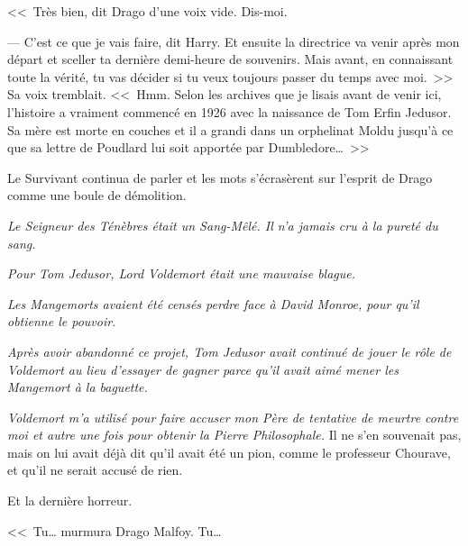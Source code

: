<<~Très bien, dit Drago d'une voix vide. Dis-moi.

--- C'est ce que je vais faire, dit Harry. Et ensuite la directrice va venir après mon départ et sceller ta dernière demi-heure de souvenirs. Mais avant, en connaissant toute la vérité, tu vas décider si tu veux toujours passer du temps avec moi.~>> Sa voix tremblait. <<~Hmm. Selon les archives que je lisais avant de venir ici, l'histoire a vraiment commencé en 1926 avec la naissance de Tom Erfin Jedusor. Sa mère est morte en couches et il a grandi dans un orphelinat Moldu jusqu'à ce que sa lettre de Poudlard lui soit apportée par Dumbledore…~>>

Le Survivant continua de parler et les mots s'écrasèrent sur l'esprit de Drago comme une boule de démolition.

\emph{Le Seigneur des Ténèbres était un Sang-Mêlé. Il n'a jamais cru à la pureté du sang.}

\emph{Pour Tom Jedusor, Lord Voldemort était une mauvaise blague.}

\emph{Les Mangemorts avaient été censés perdre face à David Monroe, pour qu'il obtienne le pouvoir.}

\emph{Après avoir abandonné ce projet, Tom Jedusor avait continué de jouer le rôle de Voldemort au lieu d'essayer de gagner parce qu'il avait aimé mener les Mangemort à la baguette.}

\emph{Voldemort m'a utilisé pour faire accuser mon Père de tentative de meurtre contre moi et autre une fois pour obtenir la Pierre Philosophale.} Il ne s'en souvenait pas, mais on lui avait déjà dit qu'il avait été un pion, comme le professeur Chourave, et qu'il ne serait accusé de rien.

Et la dernière horreur.

<<~Tu… murmura Drago Malfoy. Tu…


